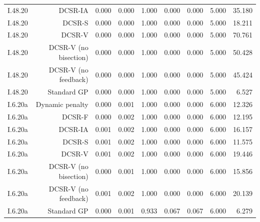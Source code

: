 \begin{tabular}{lrrrrrrrr}
I.48.20 & DCSR-IA & 0.000 & 0.000 & 1.000 & 0.000 & 0.000 & 5.000 & 35.180 \\
I.48.20 & DCSR-S & 0.000 & 0.000 & 1.000 & 0.000 & 0.000 & 5.000 & 18.211 \\
I.48.20 & DCSR-V & 0.000 & 0.000 & 1.000 & 0.000 & 0.000 & 5.000 & 70.761 \\
I.48.20 & DCSR-V (no bisection) & 0.000 & 0.000 & 1.000 & 0.000 & 0.000 & 5.000 & 50.428 \\
I.48.20 & DCSR-V (no feedback) & 0.000 & 0.000 & 1.000 & 0.000 & 0.000 & 5.000 & 45.424 \\
I.48.20 & Standard GP & 0.000 & 0.000 & 1.000 & 0.000 & 0.000 & 5.000 & 6.527 \\
I.6.20a & Dynamic penalty & 0.000 & 0.001 & 1.000 & 0.000 & 0.000 & 6.000 & 12.326 \\
I.6.20a & DCSR-F & 0.000 & 0.002 & 1.000 & 0.000 & 0.000 & 6.000 & 12.195 \\
I.6.20a & DCSR-IA & 0.001 & 0.002 & 1.000 & 0.000 & 0.000 & 6.000 & 16.157 \\
I.6.20a & DCSR-S & 0.001 & 0.002 & 1.000 & 0.000 & 0.000 & 6.000 & 11.575 \\
I.6.20a & DCSR-V & 0.001 & 0.002 & 1.000 & 0.000 & 0.000 & 6.000 & 19.446 \\
I.6.20a & DCSR-V (no bisection) & 0.000 & 0.001 & 1.000 & 0.000 & 0.000 & 6.000 & 15.856 \\
I.6.20a & DCSR-V (no feedback) & 0.001 & 0.002 & 1.000 & 0.000 & 0.000 & 6.000 & 20.139 \\
I.6.20a & Standard GP & 0.000 & 0.001 & 0.933 & 0.067 & 0.067 & 6.000 & 6.279 \\
\bottomrule
\end{tabular}
